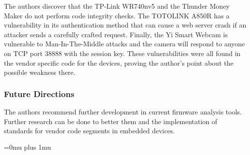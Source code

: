 \noindent
The authors discover that the TP-Link WR740nv5 and the Thunder Money Maker do not perform code integrity checks.  The TOTOLINK A850R has a vulnerability in its authentication method that can cause a web server crash if an attacker sends a carefully crafted request.  Finally, the Yi Smart Webcam is vulnerable to Man-In-The-Middle attacks and the camera will respond to anyone on TCP port 38888 with the session key.  These vulnerabilities were all found in the vendor specific code for the devices, proving the author's point about the possible weakness there.

\subsubsection{Future Directions}

\noindent
The authors recommend further development in current firmware analysis tools.  Further research can be done to better them and the implementation of standards for vendor code segments in embedded devices.

\Urlmuskip=0mu plus 1mu\relax
\pagebreak
